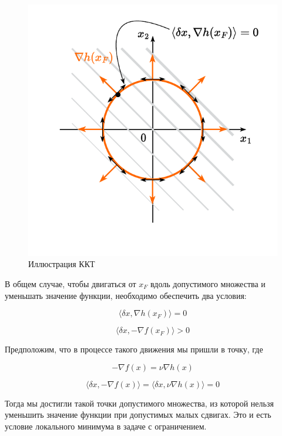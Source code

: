 \documentclass[
  russian,
  letterpaper,
  DIV=11,
  numbers=noendperiod]{scrartcl}
\begin{document}
\begin{figure}[H]

{\centering \includegraphics[width=0.5\linewidth,height=\textheight,keepaspectratio]{eq_constr_9.pdf}

}

\caption{Иллюстрация ККТ}

\end{figure}%

В общем случае, чтобы двигаться от \(x_F\) вдоль допустимого множества и
уменьшать значение функции, необходимо обеспечить два условия:

\[
\langle \delta x, \nabla h(x_F) \rangle = 0
\]

\[
\langle \delta x, - \nabla f(x_F) \rangle > 0
\]

Предположим, что в процессе такого движения мы пришли в точку, где

\[
-\nabla f(x) = \nu \nabla h(x)
\]

\[
\langle  \delta x, - \nabla f(x)\rangle = \langle  \delta x, \nu\nabla h(x)\rangle = 0  
\]

Тогда мы достигли такой точки допустимого множества, из которой нельзя
уменьшить значение функции при допустимых малых сдвигах. Это и есть
условие локального минимума в задаче с ограничением.
\end{document}
